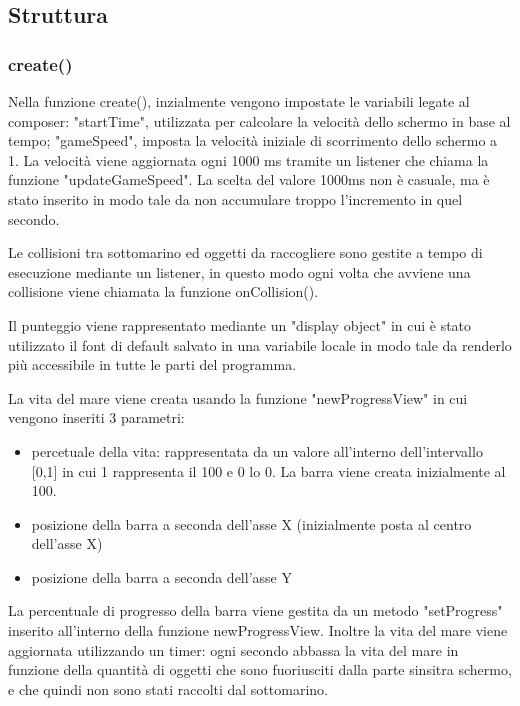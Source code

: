 \documentclass[12pt]{article}
\begin{document}
\subsection{Struttura}
\subsubsection{create()}
Nella funzione create(), inzialmente vengono impostate le variabili legate al composer: "startTime", utilizzata per calcolare la 
velocità dello schermo in base al tempo; "gameSpeed", imposta la velocità iniziale di scorrimento dello schermo a 1. 
La velocità viene aggiornata ogni 1000 ms tramite un listener che chiama la funzione "updateGameSpeed". 
La scelta del valore 1000ms non è casuale, ma è stato inserito in modo tale da non accumulare troppo l'incremento in quel secondo.

Le collisioni tra sottomarino ed oggetti da raccogliere sono gestite a tempo di esecuzione mediante un listener, in questo modo ogni volta che avviene una collisione viene chiamata la funzione onCollision(). 

Il punteggio viene rappresentato mediante un "display object" in cui è stato utilizzato il font di default salvato in una variabile locale in modo tale da renderlo più accessibile in tutte le parti del programma. 

La vita del mare viene creata usando la funzione "newProgressView" in cui vengono inseriti 3 parametri:
\begin{itemize}
    \item percetuale della vita: rappresentata da un valore all'interno dell'intervallo [0,1] in cui 1 rappresenta il 100 e 0 lo 0. La barra viene creata inizialmente al 100.
    \item posizione della barra a seconda dell'asse X (inizialmente posta al centro dell'asse X)
    \item posizione della barra a seconda dell'asse Y
\end{itemize}

La percentuale di progresso della barra viene gestita da un metodo "setProgress" inserito all'interno della funzione newProgressView. Inoltre la vita del mare viene aggiornata utilizzando un timer: ogni secondo abbassa la vita del mare in funzione della quantità di oggetti che sono fuoriusciti dalla parte sinsitra schermo, e che quindi non sono stati raccolti dal sottomarino. 
\end{document}
